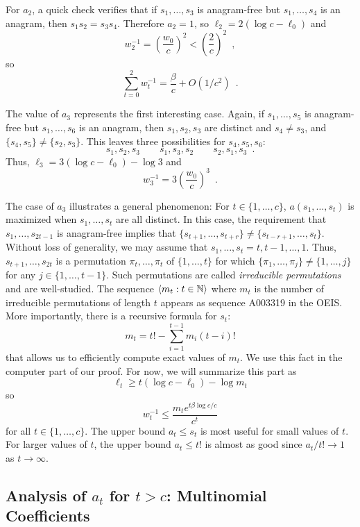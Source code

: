\documentclass{patmorin}
\begin{document}
For $a_2$, a quick check verifies that if $s_1,\ldots,s_3$ is anagram-free but $s_1,\ldots,s_4$ is an anagram, then $s_1s_2=s_3s_4$.  Therefore $a_2=1$, so
$\ell_2 = 2(\log c - \ell_0)$ and
\[
   w_2^{-1} = \left(\frac{w_0}{c}\right)^2 < \left(\frac{2}{c}\right)^2 \enspace , 
\]
so 
\[
  \sum_{t=0}^2 w_t^{-1} = \frac{\beta}{c} + O(1/c^2) \enspace .
\]

The value of $a_3$ represents the first interesting case.  Again, if $s_1,\ldots,s_5$ is anagram-free but $s_1,\ldots,s_6$ is an anagram, then $s_1,s_2,s_3$ are distinct and $s_4\neq s_3$, and $\{s_4,s_5\}\neq \{s_2,s_3\}$.  This leaves three possibilities for $s_4,s_5,s_6$:
\[   s_1,s_2,s_3 \qquad s_1,s_3,s_2 \qquad s_2,s_1,s_3 \enspace . \]
Thus, $\ell_3 = 3(\log c - \ell_0) - \log 3$ and
\[
   w_3^{-1} = 3\left(\frac{w_0}{c}\right)^{3} \enspace .
\]

The case of $a_3$ illustrates a general phenomenon: For $t\in\{1,\ldots,c\}$, $a(s_1,\ldots,s_t)$ is maximized when $s_1,\ldots,s_t$ are all distinct.  In this case, the requirement that $s_1,\ldots,s_{2t-1}$ is anagram-free implies that $\{s_{t+1},\ldots,s_{t+r}\}\neq\{s_{t-r+1},\ldots,s_t\}$.  Without loss of generality, we may assume that $s_1,\ldots,s_t=t,t-1,\ldots,1$.  Thus, $s_{t+1},\ldots,s_{2t}$ is a permutation $\pi_t,\ldots,\pi_t$ of $\{1,\ldots,t\}$ for which $\{\pi_1,\ldots,\pi_j\}\neq\{1,\ldots,j\}$ for any $j\in\{1,\ldots,t-1\}$.  Such permutations are called \emph{irreducible permutations} and are well-studied.  The sequence $\langle m_t: t\in\mathbb{N}\rangle$ where $m_t$ is the number of irreducible permutations of length $t$ appears as sequence A003319 in the OEIS.  More importantly, there is a recursive formula for $s_t$:
\[
   m_t = t! - \sum_{i=1}^{t-1} m_i(t-i)!
\]
that allows us to efficiently compute exact values of $m_t$. We use this fact in the computer part of our proof.  For now, we will summarize this part as
\[
    \ell_t \ge t(\log c-\ell_0) - \log m_t
\]
so
\[
   w_t^{-1} \le \frac{m_t e^{t\beta\log c/c}}{c^t}
\]
for all $t\in\{1,\ldots,c\}$.  The upper bound $a_t \le s_t$ is most useful for small values of $t$.  For larger values of $t$, the upper bound $a_t \le t!$ is almost as good since $a_t/t!\rightarrow 1$ as $t\rightarrow\infty$.

\subsection{Analysis of $a_t$ for $t > c$: Multinomial Coefficients}
\end{document}
